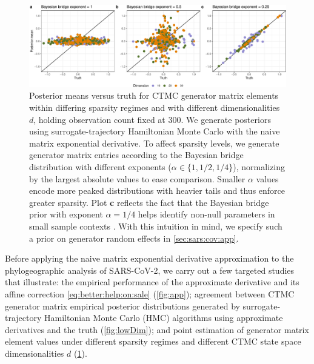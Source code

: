\documentclass[9pt,twocolumn,twoside]{pnas-new}
\newcommand{\?}{\textbf{?}}
\begin{document}
\begin{figure}[!t]
	\centering
	\includegraphics[width=\linewidth]{truthMeanFig.pdf}
	\caption{Posterior means versus truth for CTMC generator matrix elements within differing sparsity regimes and with different dimensionalities $d$, holding observation count fixed at 300. We generate posteriors using surrogate-trajectory Hamiltonian Monte Carlo with the naive matrix exponential derivative.  To affect sparsity levels, we generate generator matrix entries according to the Bayesian bridge distribution \cite{polson2014bayesian} with different exponents ($\alpha \in \{1,1/2,1/4\}$), normalizing by the largest absolute values to ease comparison. Smaller $\alpha$ values encode more peaked distributions with heavier tails and thus enforce greater sparsity.   Plot \textbf{c} reflects the fact that the Bayesian bridge prior with exponent $\alpha=1/4$ helps identify non-null parameters in small sample contexts \cite{magee2023random}.  With this intuition in mind, we specify such a prior on generator random effects in \cref{sec:sars:cov:app}.}
	\label{fig:truthMean}
\end{figure}


Before applying the naive matrix exponential derivative approximation to the phylogeographic analysis of SARS-CoV-2, we carry out a few targeted studies that illustrate: the empirical performance of the approximate derivative and its affine correction \eqref{eq:better:help:on:sale} (\cref{fig:app}); agreement between CTMC generator matrix empirical posterior distributions generated by surrogate-trajectory Hamiltonian Monte Carlo (HMC) algorithms using approximate derivatives and the truth (\cref{fig:lowDim}); and point estimation of generator matrix element values under different sparsity regimes and different CTMC state space dimensionalities $d$ (\cref{fig:truthMean}). 
\end{document}
